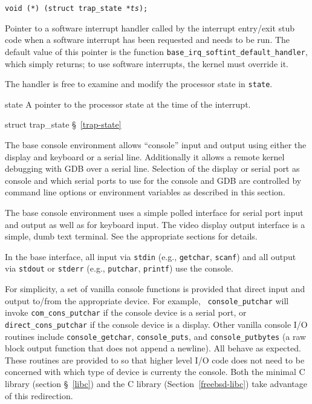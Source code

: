 \label{base-irq-softint-handler}
\begin{apisyn}

	{\tt void (*)
		(struct~trap_state *\emph{ts});}
\end{apisyn}
\begin{apidesc}
	Pointer to a software interrupt handler called by the interrupt
        entry/exit
	stub code when a software interrupt has been requested and
	needs to be run.
	The default value of this pointer is the function
	{\tt base_irq_softint_default_handler}, which simply returns;
	to use software interrupts, the kernel must override it.

	The handler is free to examine and modify the processor state
	in {\tt state}.
\end{apidesc}
\begin{apiparm}
	\item[state]
		A pointer to the processor state at the time of the interrupt.
\end{apiparm}
\begin{apidep}
	\item[struct trap_state]	\S~\ref{trap-state}
\end{apidep}


\label{kern-x86pc-base-console}
\label{kern-x86pc-base-lastsection}

The base console environment allows ``console'' input and output using either
the display and keyboard or a serial line.
Additionally it allows a remote kernel debugging with GDB over a serial line.
Selection of the display or serial port as console and which serial ports to
use for the console and GDB are controlled by
command line options or environment variables as described in this section.

The base console environment uses a simple polled interface for serial port
input and output as well as for keyboard input.
The video display output interface is a simple, dumb text terminal.
See the appropriate sections for details.

In the base interface, all input via \texttt{stdin}
(e.g., \texttt{getchar}, \texttt{scanf})
and all output via \texttt{stdout} or \texttt{stderr}
(e.g., \texttt{putchar}, \texttt{printf})
use the console.

For simplicity, a set of vanilla console functions is provided that direct
input and output to/from the appropriate device. For example, {\tt
console_putchar} will invoke {\tt com_cons_putchar} if the console device
is a serial port, or {\tt direct_cons_putchar} if the console device is a
display. Other vanilla console I/O routines include {\tt console_getchar},
{\tt console_puts}, and {\tt console_putbytes} (a raw block output function
that does not append a newline). All behave as expected. These routines are
provided to so that higher level I/O code does not need to be concerned
with which type of device is currenty the console. Both the minimal C
library (section \S~\ref{libc}) and the \freebsd{} C library
(Section~\ref{freebsd-libc}) take advantage of this redirection.

